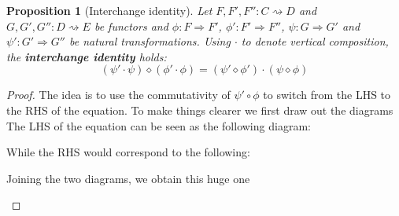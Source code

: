 \documentclass{scrartcl}
\newtheorem{prop}[thm]{Proposition}
\theoremstyle{definition}
\theoremstyle{remark}
\begin{document}
\begin{prop}[Interchange identity]
    Let $F,F',F'': C\rightsquigarrow D$ and $G,G',G'': D\rightsquigarrow E$ be functors and $\phi:F\Rightarrow F'$, $\phi':F'\Rightarrow F''$, $\psi:G\Rightarrow G'$ and $\psi':G'\Rightarrow G''$ be natural transformations. Using $\cdot$ to denote vertical composition, the \textbf{interchange identity} holds:
    \[(\psi' \cdot \psi) \diamond (\phi' \cdot \phi) = (\psi' \diamond \phi') \cdot (\psi \diamond \phi)\]
\end{prop}
\begin{proof}
The idea is to use the commutativity of $\psi ' \circ \phi$ to switch from the LHS to the RHS of the equation.
To make things clearer we first draw out the diagrams
The LHS of the equation can be seen as the following diagram:
\begin{figure}[h]
    \centering
{}
\end{figure}

While the RHS would correspond to the following:
\begin{figure}[h]
    \centering
{}
\end{figure}

Joining the two diagrams, we obtain this huge one
\begin{figure}[h]
    \centering
{}
\end{figure}
\end{proof}
\end{document}
